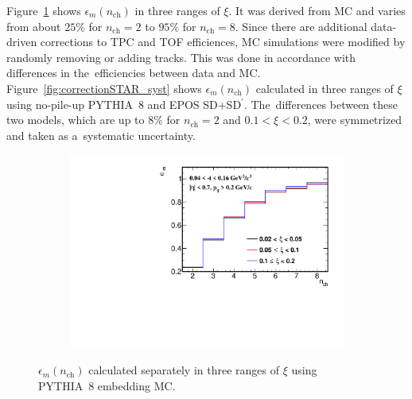 Figure~\ref{fig:correctionSTAR} shows $\epsilon_{m}(n_\textrm{ch})$  in three ranges of $\xi$. It was derived from MC and varies from about $25\%$ for $n_\textrm{ch}=2$ to $95\%$ for $n_\textrm{ch}=8$. Since there are additional data-driven corrections to \ac{TPC} and TOF efficiences,  MC simulations were modified by randomly removing or adding tracks. This was done in accordance with differences in the~efficiencies between data and MC. 
Figure~\ref{fig:correctionSTAR_syst} shows  $\epsilon_{m}(n_\textrm{ch})$ calculated in three ranges of $\xi$ using no-pile-up PYTHIA~8 and EPOS SD+SD$^\prime$. The~differences between
these two models, which are up to $8\%$ for $n_\textrm{ch}=2$ and $0.1<\xi<0.2$, were symmetrized and taken as a~systematic uncertainty.


\begin{figure}[h!]
	\centering
		\begin{subfigure}{.49\textwidth}
			\includegraphics[width=\textwidth,page=1]{chapters/chrgSTAR/img/unfolding/correction_0.pdf}
		\end{subfigure}
		\begin{minipage}{.49\textwidth}
			\caption{$\epsilon_{m}(n_\textrm{ch})$  calculated separately in three ranges of $\xi$ using PYTHIA~8 embedding MC.}
			\label{fig:correctionSTAR}
		\end{minipage}
	
\end{figure}


